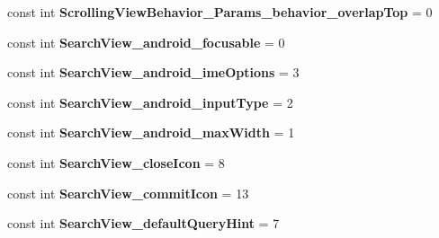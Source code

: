 \begin{DoxyCompactItemize}
\item 
\hypertarget{classClient_1_1Droid_1_1Resource_1_1Styleable_ac2baeb6e8ab277a633c516ca64098187}{}const int {\bfseries Scrolling\+View\+Behavior\+\_\+\+Params\+\_\+behavior\+\_\+overlap\+Top} = 0\label{classClient_1_1Droid_1_1Resource_1_1Styleable_ac2baeb6e8ab277a633c516ca64098187}

\item 
\hypertarget{classClient_1_1Droid_1_1Resource_1_1Styleable_a3693fe0b36d6791675fde6353907f6d1}{}const int {\bfseries Search\+View\+\_\+android\+\_\+focusable} = 0\label{classClient_1_1Droid_1_1Resource_1_1Styleable_a3693fe0b36d6791675fde6353907f6d1}

\item 
\hypertarget{classClient_1_1Droid_1_1Resource_1_1Styleable_acfd96cf13e39ada9f70781029d4b098c}{}const int {\bfseries Search\+View\+\_\+android\+\_\+ime\+Options} = 3\label{classClient_1_1Droid_1_1Resource_1_1Styleable_acfd96cf13e39ada9f70781029d4b098c}

\item 
\hypertarget{classClient_1_1Droid_1_1Resource_1_1Styleable_ab1c5e8241e36dda5adb168695954b6a4}{}const int {\bfseries Search\+View\+\_\+android\+\_\+input\+Type} = 2\label{classClient_1_1Droid_1_1Resource_1_1Styleable_ab1c5e8241e36dda5adb168695954b6a4}

\item 
\hypertarget{classClient_1_1Droid_1_1Resource_1_1Styleable_a1cbe7cdd5557223a8a3aed665eeca256}{}const int {\bfseries Search\+View\+\_\+android\+\_\+max\+Width} = 1\label{classClient_1_1Droid_1_1Resource_1_1Styleable_a1cbe7cdd5557223a8a3aed665eeca256}

\item 
\hypertarget{classClient_1_1Droid_1_1Resource_1_1Styleable_ad3010543ef9068cdb9240da83870312f}{}const int {\bfseries Search\+View\+\_\+close\+Icon} = 8\label{classClient_1_1Droid_1_1Resource_1_1Styleable_ad3010543ef9068cdb9240da83870312f}

\item 
\hypertarget{classClient_1_1Droid_1_1Resource_1_1Styleable_ad68ebc61e565588f655eac2ff408aa26}{}const int {\bfseries Search\+View\+\_\+commit\+Icon} = 13\label{classClient_1_1Droid_1_1Resource_1_1Styleable_ad68ebc61e565588f655eac2ff408aa26}

\item 
\hypertarget{classClient_1_1Droid_1_1Resource_1_1Styleable_a72a094bad8c42358b054990f908712ea}{}const int {\bfseries Search\+View\+\_\+default\+Query\+Hint} = 7\label{classClient_1_1Droid_1_1Resource_1_1Styleable_a72a094bad8c42358b054990f908712ea}


\end{DoxyCompactItemize}
